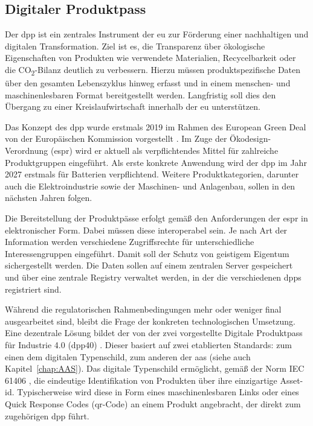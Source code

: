 \subsection{Digitaler Produktpass}
Der \acs{dpp} ist ein zentrales Instrument der \acs{eu} zur Förderung einer nachhaltigen und digitalen Transformation. 
Ziel ist es, die Transparenz über ökologische Eigenschaften von Produkten wie verwendete Materialien, Recycelbarkeit oder die CO\textsubscript{2}-Bilanz deutlich zu verbessern.
Hierzu müssen produktspezifische Daten über den gesamten Lebenszyklus hinweg erfasst und in einem menschen- und maschinenlesbaren Format bereitgestellt werden. \cite{DPPEinführung}
Langfristig soll dies den Übergang zu einer Kreislaufwirtschaft innerhalb der \acs{eu} unterstützen.

Das Konzept des \acs{dpp} wurde erstmals 2019 im Rahmen des European Green Deal von der Europäischen Kommission vorgestellt \cite{GreenDeal}.
Im Zuge der Ökodesign-Verordnung (\ac{espr}) \cite{ESPR} wird er aktuell als verpflichtendes Mittel für zahlreiche Produktgruppen eingeführt.
Als erste konkrete Anwendung wird der \acs{dpp} im Jahr 2027 erstmals für Batterien verpflichtend.
Weitere Produktkategorien, darunter auch die Elektroindustrie sowie der Maschinen- und Anlagenbau, sollen in den nächsten Jahren folgen.

Die Bereitstellung der Produktpässe erfolgt gemäß den Anforderungen der \acs{espr} in elektronischer Form. 
Dabei müssen diese interoperabel sein.
Je nach Art der Information werden verschiedene Zugriffsrechte für unterschiedliche Interessengruppen eingeführt. 
Damit soll der Schutz von geistigem Eigentum sichergestellt werden.
Die Daten sollen auf einem zentralen Server gespeichert und über eine zentrale Registry verwaltet werden, in der die verschiedenen \acsp{dpp} registriert sind.
\cite{CIRPASS}

Während die regulatorischen Rahmenbedingungen mehr oder weniger final ausgearbeitet sind, bleibt die Frage der konkreten technologischen Umsetzung.
Eine dezentrale Lösung bildet der von der \acs{zvei} vorgestellte Digitale Produktpass für Industrie 4.0 (\acs{dpp40}) \cite{DPP40}.
Dieser basiert auf zwei etablierten Standards: zum einen dem digitalen Typenschild, zum anderen der \acs{aas} (siehe auch Kapitel~\ref{chap:AAS}).
Das digitale Typenschild ermöglicht, gemäß der Norm IEC 61406 \cite{TypenschildIEC61406-1}, die eindeutige Identifikation von Produkten über ihre einzigartige Asset-\acs{id}.
Typischerweise wird diese in Form eines maschinenlesbaren Links oder eines Quick Response Codes (\acs{qr}-Code) an einem Produkt angebracht, der direkt zum zugehörigen \acs{dpp} führt.

